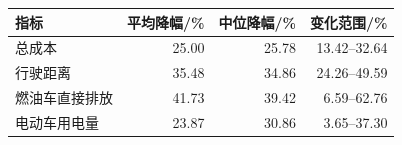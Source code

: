 \begin{tabular*}{0.84\linewidth}{@{\extracolsep{\fill}}lrrr@{}}
\toprule
指标 & 平均降幅/\% & 中位降幅/\% & 变化范围/\% \\
\midrule
总成本 & 25.00 & 25.78 & 13.42--32.64 \\
行驶距离 & 35.48 & 34.86 & 24.26--49.59 \\
燃油车直接排放 & 41.73 & 39.42 & 6.59--62.76 \\
电动车用电量 & 23.87 & 30.86 & 3.65--37.30 \\
\bottomrule
\end{tabular*}
